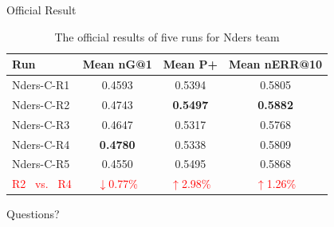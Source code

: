 \documentclass[aspectratio=169]{beamer}
\begin{document}
  \begin{frame}{Official Result}
    \begin{table}
\centering
\caption{The official results of five runs for Nders team}
\label{tab:commands}
\begin{minipage}{\columnwidth}
\begin{center}
\begin{tabular}{|l|c|c|c|}
\hline
 Run        &  Mean nG@1  &  Mean P+  &  Mean nERR@10  \\ \hline
 Nders-C-R1 & 0.4593 & 0.5394 & 0.5805 \\ \hline
 Nders-C-R2 & 0.4743 & \textbf{0.5497} & \textbf{0.5882} \\ \hline
 Nders-C-R3 & 0.4647 & 0.5317 & 0.5768 \\ \hline
 Nders-C-R4 & \textbf{0.4780} & 0.5338 & 0.5809 \\ \hline
 Nders-C-R5 & 0.4550 & 0.5495 & 0.5868 \\ \hline
 \textcolor{red}{R2 \ vs. \  R4}  & \textcolor{red}{$\downarrow$0.77\%} & \textcolor{red}{$\uparrow$2.98\%} & \textcolor{red}{$\uparrow$1.26\%} \\ \hline

\end{tabular}
\end{center}
\end{minipage}
\end{table}
  \end{frame}

  \begin{frame}[standout]
    Questions?
  \end{frame}
\end{document}
